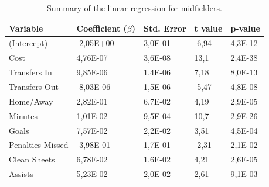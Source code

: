 \begin{table}[H]
\centering
\begin{tabular}{|l|l|l|l|l|}
\hline
Variable         & Coefficient ($\beta$)  & Std. Error & t value & p-value \\ \hline
(Intercept)      & -2,05E+00 & 3,0E-01    & -6,94   & 4,3E-12 \\
Cost             & 4,76E-07  & 3,6E-08    & 13,1   & 2,4E-38 \\
Transfers In     & 9,85E-06  & 1,4E-06    & 7,18    & 8,0E-13 \\
Transfers Out    & -8,03E-06 & 1,5E-06    & -5,47   & 4,8E-08 \\
Home/Away        & 2,82E-01  & 6,7E-02    & 4,19    & 2,9E-05 \\
Minutes          & 1,01E-02  & 9,5E-04    & 10,7   & 2,9E-26 \\
Goals            & 7,57E-02  & 2,2E-02    & 3,51    & 4,5E-04 \\
Penalties Missed & -3,98E-01 & 1,7E-01    & -2,31   & 2,1E-02 \\
Clean Sheets     & 6,78E-02  & 1,6E-02    & 4,21    & 2,6E-05 \\
Assists          & 5,23E-02  & 2,0E-02    & 2,61    & 9,1E-03 \\
\hline
\end{tabular}
\caption{Summary of the linear regression for midfielders.}
\label{tab:coef_MID}
\end{table}

